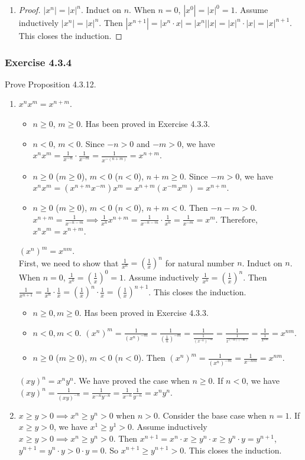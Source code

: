 \documentclass[12pt, letter]{article}
\newcommand{\ssc}{\subsubsection* }
\newcommand{\E}{Exercise }
\begin{document}
\begin{enumerate}[label=(\alph*)]
\begin{proof}
        The latter part can be shown in a similar way.
    \end{proof}
    \item \begin{proof}
        $|x^n|=|x|^n$. Induct on $n$. When $n=0$, $|x^0|=|x|^0=1$. Assume inductively $|x^n|=|x|^n$. Then $|x^{n+1}|=|x^n\cdot x|=|x^n||x|=|x|^n\cdot |x|=|x|^{n+1}$.
        This closes the induction.
    \end{proof}
\end{enumerate}
\ssc{\E 4.3.4}
Prove Proposition 4.3.12.
\begin{enumerate}[label=(\alph*)]
    \item $x^n x^m=x^{n+m}$. 
    \begin{itemize}
        \item $n\geq 0$, $m\geq 0$. Has been proved in Exercise 4.3.3.
        \item $n<0$, $m<0$. Since $-n>0$ and $-m>0$, we have $x^n x^m=\frac{1}{x^{-n}}\cdot \frac{1}{x^{-m}}=\frac{1}{x^{-(n+m)}}=x^{n+m}$.
        \item $n\geq 0$ ($m\geq 0$), $m<0$ ($n<0$), $n+m\geq 0$. Since $-m>0$, we have $x^n x^m=(x^{n+m}x^{-m})x^m=x^{n+m}(x^{-m}x^m)=x^{n+m}$.
        \item $n\geq 0$ ($m\geq 0$), $m<0$ ($n<0$), $n+m<0$. Then $-n-m>0$. $x^{n+m}=\frac{1}{x^{-n-m}}\implies \frac{1}{x^n}x^{n+m}=\frac{1}{x^{-n-m}}\cdot\frac{1}{x^n}
        =\frac{1}{x^{-m}}=x^m$. Therefore, $x^n x^m=x^{n+m}$.
    \end{itemize}
    $(x^n)^m=x^{nm}$. \\
    First, we need to show that $\frac{1}{x^n}=(\frac{1}{x})^n$ for natural number $n$. Induct on $n$. When $n=0$, $\frac{1}{x^0}=(\frac{1}{x})^0=1$. 
    Assume inductively $\frac{1}{x^n}=(\frac{1}{x})^n$. Then $\frac{1}{x^{n+1}}=\frac{1}{x^n}\cdot \frac{1}{x}=(\frac{1}{x})^n\cdot\frac{1}{x}=(\frac{1}{x})^{n+1}$. 
    This closes the induction.
    \begin{itemize}
        \item $n\geq 0, m\geq 0$. Has been proved in Exercise 4.3.3.
        \item $n<0, m<0$. $(x^n)^m=\frac{1}{(x^n)^{-m}}=\frac{1}{(\frac{1}{n})^{-m}}=\frac{1}{\frac{1}{(x^{-n})^{-m}}}=\frac{1}{\frac{1}{x^{(-n)(-m)}}}=\frac{1}{\frac{1}{x^{nm}}}=x^{nm}$.
        \item $n\geq 0$ ($m\geq 0$), $m<0$ ($n<0$). Then $(x^n)^m=\frac{1}{(x^n)^{-m}}=\frac{1}{x^{-nm}}=x^{nm}$.
    \end{itemize}
    $(xy)^n=x^n y^n$. We have proved the case when $n\geq 0$. If $n<0$, we have $(xy)^n=\frac{1}{(xy)^{-n}}=\frac{1}{x^{-n}y^{-n}}=\frac{1}{x^{-n}}\frac{1}{y^{-n}}=x^n y^n$.
    \item $x\geq y>0\implies x^n\geq y^n>0$ when $n>0$. Consider the base case when $n=1$. If $x\geq y>0$, we have $x^1\geq y^1>0$. Assume inductively $x\geq y>0\implies x^n\geq y^n>0$.
    Then $x^{n+1}=x^n\cdot x\geq y^n\cdot x\geq y^n\cdot y=y^{n+1}$, $y^{n+1}=y^n\cdot y>0\cdot y=0$. So $x^{n+1}\geq y^{n+1}>0$. This closes the induction.


\end{enumerate}
\end{document}

